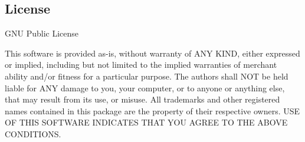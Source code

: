 \hypertarget{index_license}{}\subsection{License}\label{index_license}
G\+NU Public License

This software is provided as-\/is, without warranty of A\+NY K\+I\+ND, either expressed or implied, including but not limited to the implied warranties of merchant ability and/or fitness for a particular purpose. The authors shall N\+OT be held liable for A\+NY damage to you, your computer, or to anyone or anything else, that may result from its use, or misuse. All trademarks and other registered names contained in this package are the property of their respective owners. U\+SE OF T\+H\+IS S\+O\+F\+T\+W\+A\+RE I\+N\+D\+I\+C\+A\+T\+ES T\+H\+AT Y\+OU A\+G\+R\+EE TO T\+HE A\+B\+O\+VE C\+O\+N\+D\+I\+T\+I\+O\+NS. 